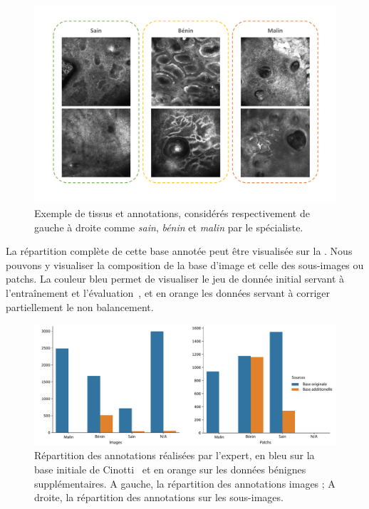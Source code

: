\begin{figure}[H]
    \begin{center}
        \includegraphics[width=\linewidth]{contents/iii_preamble_microscopy/resources/example_rcm_data.pdf}
        \caption{Exemple de tissus et annotations, considérés respectivement de gauche à droite comme \textit{sain}, \textit{bénin} et \textit{malin} par le spécialiste.}
        \label{fig:example_rcm_data}
    \end{center} 
\end{figure}\par

La répartition complète de cette base annotée peut être visualisée sur la . Nous pouvons y visualiser la composition de la base d'image et celle des sous-images ou patchs. La couleur bleu permet de visualiser le jeu de donnée initial servant à l'entraînement et l'évaluation~\cite{Cinotti2018}, et en orange les données servant à corriger partiellement le non balancement.\par

\begin{figure}[H]
    \begin{center}
        \includegraphics[width=\linewidth]{contents/iii_preamble_microscopy/resources/scheme_rcm_statistics.pdf}
        \caption{Répartition des annotations réalisées par l'expert, en bleu sur la base initiale de Cinotti~\cite{Cinotti2018} et en orange sur les données bénignes supplémentaires. A gauche, la répartition des annotations images ; A droite, la répartition des annotations sur les sous-images.}
        \label{fig:scheme_rcm_statistics}
    \end{center} 
\end{figure}\par

